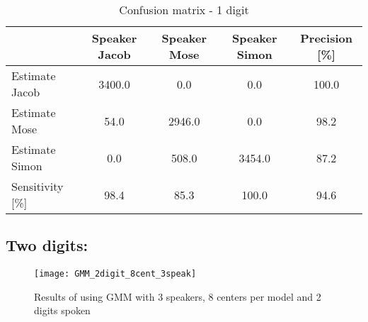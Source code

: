 \begin{table}[H]                                                   
\centering                                                          
\begin{tabular}{|l|c|c|c|c|}                                        
\hline                                                              
  & Speaker Jacob & Speaker Mose & Speaker Simon & Precision [\%] \\
\hline                                                              
Estimate Jacob & 3400.0 & 0.0 & 0.0 & 100.0 \\                      
\hline                                                              
Estimate Mose & 54.0 & 2946.0 & 0.0 & 98.2 \\                       
\hline                                                              
Estimate Simon & 0.0 & 508.0 & 3454.0 & 87.2 \\                     
\hline                                                              
Sensitivity [\%] & 98.4 & 85.3 & 100.0 & 94.6 \\                    
\hline                                                              
\end{tabular}                                                       
\caption{Confusion matrix - 1 digit}                                
\label{table:GMM_conf_1}                                            
\end{table} 


\subsection{Two digits:}
\begin{figure}[H]
\centering
\texttt{[image: GMM\_2digit\_8cent\_3speak]}
\caption{Results of using GMM with 3 speakers, 8 centers per model and 2 digits spoken}
\label{fig:GMM_fig_2}
\end{figure}

